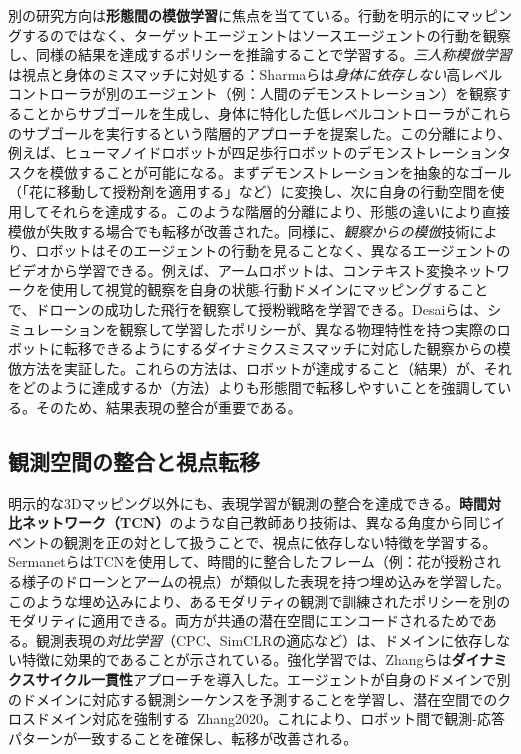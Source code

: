 \documentclass[a4paper,fleqn,10pt,twocolumn]{template_v1.0}
\begin{document}
別の研究方向は\textbf{形態間の模倣学習}に焦点を当てている。行動を明示的にマッピングするのではなく、ターゲットエージェントはソースエージェントの行動を観察し、同様の結果を達成するポリシーを推論することで学習する。\textit{三人称模倣学習}は視点と身体のミスマッチに対処する：Sharmaらは\textit{身体に依存しない}高レベルコントローラが別のエージェント（例：人間のデモンストレーション）を観察することからサブゴールを生成し、身体に特化した低レベルコントローラがこれらのサブゴールを実行するという階層的アプローチを提案した\cite{Sharma2019}\cite{Niu2024}。この分離により、例えば、ヒューマノイドロボットが四足歩行ロボットのデモンストレーションタスクを模倣することが可能になる。まずデモンストレーションを抽象的なゴール（「花に移動して授粉剤を適用する」など）に変換し、次に自身の行動空間を使用してそれらを達成する。このような階層的分離により、形態の違いにより直接模倣が失敗する場合でも転移が改善された\cite{Niu2024}。同様に、\textit{観察からの模倣}技術により、ロボットはそのエージェントの行動を見ることなく、異なるエージェントのビデオから学習できる。例えば、アームロボットは、コンテキスト変換ネットワークを使用して視覚的観察を自身の状態-行動ドメインにマッピングすることで、ドローンの成功した飛行を観察して授粉戦略を学習できる\cite{Liu2018}\cite{Taylor2009}。Desaiらは、シミュレーションを観察して学習したポリシーが、異なる物理特性を持つ実際のロボットに転移できるようにするダイナミクスミスマッチに対応した観察からの模倣方法を実証した\cite{Desai2020}。これらの方法は、ロボットが達成すること（結果）が、それをどのように達成するか（方法）よりも形態間で転移しやすいことを強調している。そのため、結果表現の整合が重要である。

\subsection{観測空間の整合と視点転移}

明示的な3Dマッピング以外にも、表現学習が観測の整合を達成できる。\textbf{時間対比ネットワーク（TCN）}のような自己教師あり技術は、異なる角度から同じイベントの観測を正の対として扱うことで、視点に依存しない特徴を学習する\cite{Sermanet2018}。SermanetらはTCNを使用して、時間的に整合したフレーム（例：花が授粉される様子のドローンとアームの視点）が類似した表現を持つ埋め込みを学習した\cite{Sermanet2018}。このような埋め込みにより、あるモダリティの観測で訓練されたポリシーを別のモダリティに適用できる。両方が共通の潜在空間にエンコードされるためである。観測表現の\textit{対比学習}（CPC、SimCLRの適応など）は、ドメインに依存しない特徴に効果的であることが示されている\cite{Tian2020}。強化学習では、Zhangらは\textbf{ダイナミクスサイクル一貫性}アプローチを導入した。エージェントが自身のドメインで別のドメインに対応する観測シーケンスを予測することを学習し、潜在空間でのクロスドメイン対応を強制する\
{Zhang2020}。これにより、ロボット間で観測-応答パターンが一致することを確保し、転移が改善される。
\end{document}
